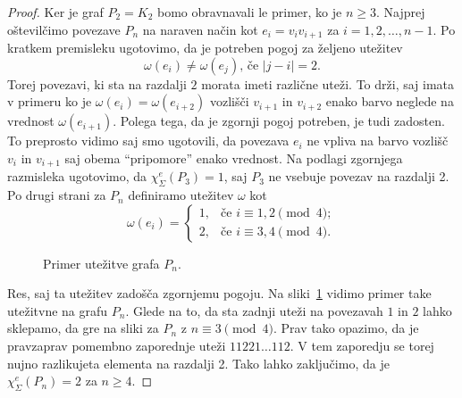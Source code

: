 \documentclass[12pt,a4paper,twoside]{article}
\theoremstyle{definition} %
\theoremstyle{plain} %
\newcommand{\ec}{\chi_{\Sigma}^e}
\numberwithin{equation}{section}  %
\begin{document}
\begin{proof}
	Ker je graf $P_2 = K_2$ bomo obravnavali le primer, ko je $n \ge 3$. Najprej oštevilčimo povezave $P_n$ na naraven način kot $e_i = v_i v_{i+1}$ za $i=1,2,\ldots, n-1$. Po kratkem premisleku ugotovimo, da je potreben pogoj za željeno utežitev
	$$\omega(e_i) \neq \omega(e_j) \text{, če } |j-i| = 2 .$$
	Torej povezavi, ki sta na razdalji $2$ morata imeti različne uteži. To drži, saj imata v primeru ko je $\omega(e_i) = \omega(e_{i+2})$ vozlišči $v_{i+1}$ in $v_{i+2}$ enako barvo neglede na vrednost $\omega(e_{i+1})$. Polega tega, da je zgornji pogoj potreben, je tudi zadosten. To preprosto vidimo saj smo ugotovili, da povezava $e_{i}$ ne vpliva na barvo vozlišč $v_i$ in $v_{i+1}$ saj obema ``pripomore'' enako vrednost. Na podlagi zgornjega razmisleka ugotovimo, da $\ec(P_3) = 1$, saj $P_3$ ne vsebuje povezav na razdalji 2. Po drugi strani za $P_n$ definiramo utežitev $\omega$ kot
	\begin{equation*}
	\omega(e_i) = \begin{cases}
			1, &\text{če } i \equiv 1,2 \pmod{4} ;\\ 
			2, &\text{če } i \equiv 3,4 \pmod{4} .
	\end{cases}
	\end{equation*}
	
	\begin{figure}[!h]
		\centering
		
		\caption{Primer utežitve grafa $P_n$.}
	\label{pn}
	\end{figure}
	Res, saj ta utežitev zadošča zgornjemu pogoju. Na sliki~\ref{pn} vidimo primer take utežitvne na grafu $P_n$. Glede na to, da sta zadnji uteži na povezavah $1$ in $2$ lahko sklepamo, da gre na sliki za $P_n$ z $n \equiv 3 \pmod{4}$. Prav tako opazimo, da je pravzaprav pomembno zaporednje uteži $11221\ldots 112$. V tem zaporedju se torej nujno razlikujeta elementa na razdalji 2. Tako lahko zaključimo, da je $\ec(P_n) = 2$ za $n \ge 4$. 


\end{proof}
\end{document}
